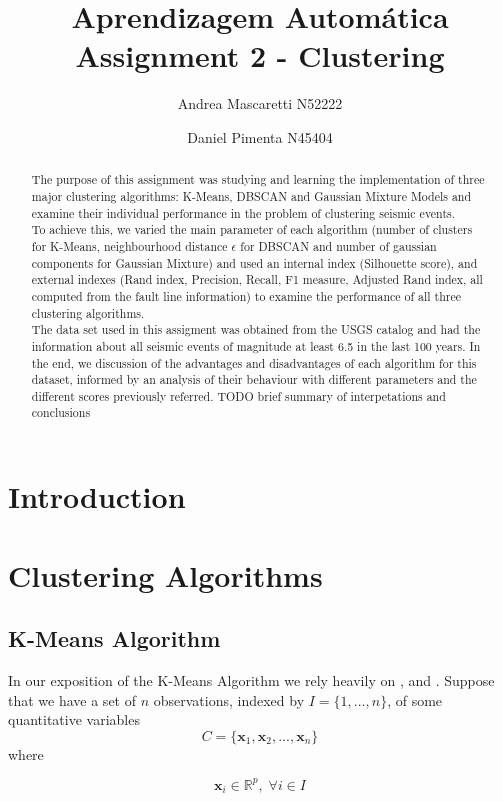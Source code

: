 \documentclass[a4paper]{article}
\title{\textbf{Aprendizagem Autom\'{a}tica} \\
	\large Assignment 2 - Clustering}
\author{Andrea Mascaretti N52222\and Daniel Pimenta N45404}
\begin{document}
	\maketitle
	\begin{abstract}
	The purpose of this assignment was studying and learning the implementation of three major clustering algorithms: K-Means, DBSCAN and Gaussian Mixture Models and 
	examine their individual performance in the problem of clustering seismic events.\\
	To achieve this, we varied the main parameter of each algorithm (number of clusters for K-Means, neighbourhood distance $\epsilon$ for DBSCAN and number of gaussian components 
	for Gaussian Mixture) and used an internal index (Silhouette score), and external indexes (Rand index, Precision, Recall, F1 measure, Adjusted Rand index, all computed from the fault line information) 
	to examine the performance of all three clustering algorithms.\\
	The data set used in this assigment was obtained from the USGS catalog and had the information about all seismic events of magnitude at least 6.5 in the last 100 years.
	In the end, we discussion of the advantages and disadvantages of each algorithm for this dataset, informed by an analysis of their behaviour with different parameters 
	and the different scores previously referred.
	TODO brief summary of interpetations and conclusions
	\end{abstract}

	\section{Introduction}
	\section{Clustering Algorithms}
	\subsection{K-Means Algorithm}
	In our exposition of the K-Means Algorithm we rely heavily on \cite{hastie01statisticallearning}, \cite{MR2372475} and \cite{zaki2014dataminingbook}.
	Suppose that we have a set of $n$ observations, indexed by $I = \{1, ..., n\}$, of some quantitative
	variables
	$$ C = \{ \boldsymbol{x}_{1}, \boldsymbol{x}_{2}, ..., \boldsymbol{x}_{n} \} $$
	where
	
	$$ \boldsymbol{x}_{i} \in \mathbb{R}^{p},\;\forall i\in I$$
	
\end{document}
